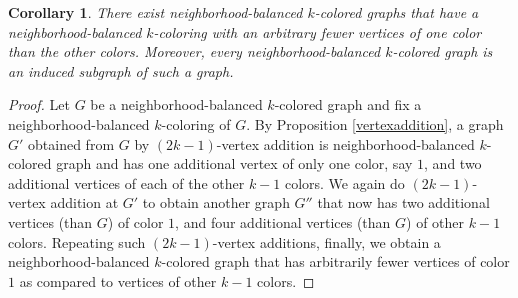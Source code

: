 \documentclass[12pt]{article}
\newtheorem{theorem}{Theorem}[section]
\newtheorem{corollary}[theorem]{Corollary}
\newcommand{\nbc}{neighborhood-balanced $k$-coloring\xspace}
\newcommand{\nbcd}{neighborhood-balanced $k$-colored\xspace}
\begin{document}
\begin{corollary}
    There exist \nbcd graphs that have a \nbc with an arbitrary fewer vertices of one color than the other colors.
    Moreover, every \nbcd graph is an induced subgraph of such a graph. 
\end{corollary}
\begin{proof}
    Let $G$ be a \nbcd graph and fix a \nbc of $G$.
    By Proposition \ref{vertexaddition}, a graph $G'$ obtained from $G$ by $(2k-1)$-vertex addition is \nbcd graph and has one additional vertex of only one color, say $1$, and two additional vertices of each of the other $k-1$ colors.
    We again do $(2k-1)$-vertex addition at $G'$ to obtain another graph $G''$ that now has two additional vertices (than $G$) of color $1$, and four additional vertices (than $G$) of other $k-1$ colors.
    Repeating such $(2k-1)$-vertex additions, finally, we obtain a \nbcd graph that has arbitrarily fewer vertices of color $1$ as compared to vertices of other $k-1$ colors.
\end{proof}




\end{document}
